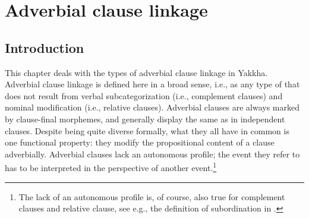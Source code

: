 \chapter{Adverbial clause linkage}\label{adv-cl}


\section{Introduction}

This chapter deals with the types of adverbial clause linkage in Yakkha. Adverbial clause linkage is defined here in a broad sense, i.e., as any type of  that does not result from verbal subcategorization (i.e., complement clauses) and nominal modification (i.e., relative clauses). Adverbial clauses are always marked by clause-final morphemes, and generally display the same  as in independent clauses. 
Despite being quite diverse formally, what they all have in common is one functional property: they modify the propositional content of a clause adverbially. Adverbial clauses lack an autonomous profile; the event they refer to has to be interpreted in the perspective of another event.\footnote{The lack of an autonomous profile is, of course, also true for complement clauses and relative clause, see e.g., the definition of subordination in \citet{Cristofaro2003Subordination}.}


